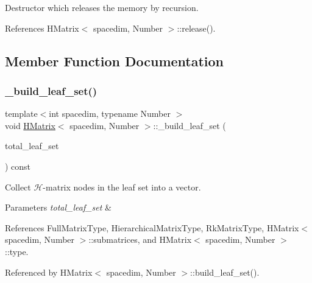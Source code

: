 Destructor which releases the memory by recursion. 

References H\+Matrix$<$ spacedim, Number $>$\+::release().



\subsection{Member Function Documentation}
\mbox{\label{classHMatrix_a60934e84cc3c9f6c75d011a2005f512a}} 
\subsubsection{\texorpdfstring{\+\_\+build\+\_\+leaf\+\_\+set()}{\_build\_leaf\_set()}}
{\footnotesize\ttfamily template$<$int spacedim, typename Number $>$ \\
void \hyperlink{classHMatrix}{H\+Matrix}$<$ spacedim, Number $>$\+::\+\_\+build\+\_\+leaf\+\_\+set (\begin{DoxyParamCaption}\item[{std\+::vector$<$ \hyperlink{classHMatrix}{H\+Matrix}$<$ spacedim, Number $>$ $\ast$$>$ \&}]{total\+\_\+leaf\+\_\+set }\end{DoxyParamCaption}) const\hspace{0.3cm}{\ttfamily [private]}}

Collect $\mathcal{H}$-\/matrix nodes in the leaf set into a vector. 
\begin{DoxyParams}{Parameters}
{\em total\+\_\+leaf\+\_\+set} & \\
\hline
\end{DoxyParams}


References Full\+Matrix\+Type, Hierarchical\+Matrix\+Type, Rk\+Matrix\+Type, H\+Matrix$<$ spacedim, Number $>$\+::submatrices, and H\+Matrix$<$ spacedim, Number $>$\+::type.



Referenced by H\+Matrix$<$ spacedim, Number $>$\+::build\+\_\+leaf\+\_\+set().

\mbox{\label{classHMatrix_ab55b568236ffdd71b5378ac6c6ace50a}} 
